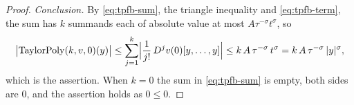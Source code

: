 \begin{proof}
\medskip\noindent\emph{Conclusion.}
By \eqref{eq:tpfb-sum}, the triangle inequality and \eqref{eq:tpfb-term}, the sum has $k$
summands each of absolute value at most $A\tau^{-\sigma}t^{\sigma}$, so
\[
  \bigl\lvert\mathrm{TaylorPoly}(k,v,0)(y)\bigr\rvert
  \le\sum_{j=1}^{k}\Bigl\lvert\frac{1}{j!}\,D^{j}v(0)[y,\ldots,y]\Bigr\rvert
  \le k\,A\,\tau^{-\sigma}\,t^{\sigma}
  =k\,A\,\tau^{-\sigma}\,\lvert y\rvert^{\sigma},
\]
which is the assertion.  When $k=0$ the sum in \eqref{eq:tpfb-sum} is empty, both sides are $0$,
and the assertion holds as $0\le0$.
\end{proof}
